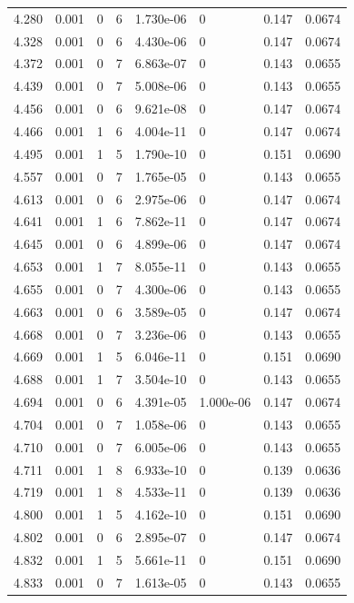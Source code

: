 \documentclass[preview]{standalone}
\begin{document}
{{{{\begin{tabular}{L{1.2cm}C{1.2cm} C{0.3cm}C{0.5cm} C{1.4cm}C{1.4cm} C{1.4cm}C{1.4cm}}
  4.280  &  0.001  & 0     &  6 &  1.730e-06  & 0  & 0.147 &  0.0674   \\ 
  4.328  &  0.001  & 0     &  6 &  4.430e-06  & 0  & 0.147 &  0.0674   \\ 
  4.372  &  0.001  & 0     &  7 &  6.863e-07  & 0  & 0.143 &  0.0655   \\ 
  4.439  &  0.001  & 0     &  7 &  5.008e-06  & 0  & 0.143 &  0.0655   \\ 
  4.456  &  0.001  & 0     &  6 &  9.621e-08  & 0  & 0.147 &  0.0674   \\ 
  4.466  &  0.001  & 1     &  6 &  4.004e-11  & 0  & 0.147 &  0.0674   \\ 
  4.495  &  0.001  & 1     &  5 &  1.790e-10  & 0  & 0.151 &  0.0690   \\ 
  4.557  &  0.001  & 0     &  7 &  1.765e-05  & 0  & 0.143 &  0.0655   \\ 
  4.613  &  0.001  & 0     &  6 &  2.975e-06  & 0  & 0.147 &  0.0674   \\ 
  4.641  &  0.001  & 1     &  6 &  7.862e-11  & 0  & 0.147 &  0.0674   \\ 
  4.645  &  0.001  & 0     &  6 &  4.899e-06  & 0  & 0.147 &  0.0674   \\ 
  4.653  &  0.001  & 1     &  7 &  8.055e-11  & 0  & 0.143 &  0.0655   \\ 
  4.655  &  0.001  & 0     &  7 &  4.300e-06  & 0  & 0.143 &  0.0655   \\ 
  4.663  &  0.001  & 0     &  6 &  3.589e-05  & 0  & 0.147 &  0.0674   \\ 
  4.668  &  0.001  & 0     &  7 &  3.236e-06  & 0  & 0.143 &  0.0655   \\ 
  4.669  &  0.001  & 1     &  5 &  6.046e-11  & 0  & 0.151 &  0.0690   \\ 
  4.688  &  0.001  & 1     &  7 &  3.504e-10  & 0  & 0.143 &  0.0655   \\ 
  4.694  &  0.001  & 0     &  6 &  4.391e-05  & 1.000e-06  & 0.147 &  0.0674   \\ 
  4.704  &  0.001  & 0     &  7 &  1.058e-06  & 0  & 0.143 &  0.0655   \\ 
  4.710  &  0.001  & 0     &  7 &  6.005e-06  & 0  & 0.143 &  0.0655   \\ 
  4.711  &  0.001  & 1     &  8 &  6.933e-10  & 0  & 0.139 &  0.0636   \\ 
  4.719  &  0.001  & 1     &  8 &  4.533e-11  & 0  & 0.139 &  0.0636   \\ 
  4.800  &  0.001  & 1     &  5 &  4.162e-10  & 0  & 0.151 &  0.0690   \\ 
  4.802  &  0.001  & 0     &  6 &  2.895e-07  & 0  & 0.147 &  0.0674   \\ 
  4.832  &  0.001  & 1     &  5 &  5.661e-11  & 0  & 0.151 &  0.0690   \\ 
  4.833  &  0.001  & 0     &  7 &  1.613e-05  & 0  & 0.143 &  0.0655   \\ 
\hline 
\end{tabular} 

}}}}
\end{document}
